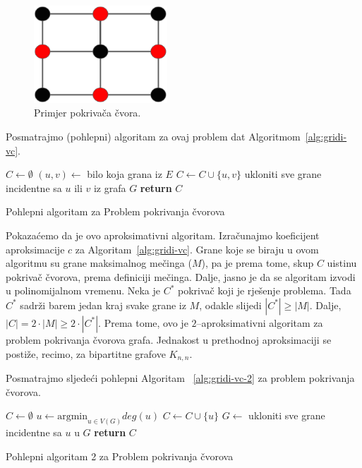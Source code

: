 \documentclass[a4paper, utf8, 11pt, colorlinks]{book}
\begin{document}
  \begin{figure}
  	\centering
  	\includegraphics[width=50mm]{vertex-cover.eps}
  	\caption{Primjer pokrivača čvora.} 
  	\label{vertex-cover}
  \end{figure}
  
  Posmatrajmo (pohlepni) algoritam za ovaj problem dat Algoritmom~\ref{alg:gridi-vc}. 
  
  \begin{algorithm}[H] 
  	\begin{algorithmic}[1]
  		\STATE $C \gets \emptyset$
  		\STATE $(u,v) \gets$ bilo koja grana iz $E$
  		\STATE $C \gets C \cup \{u,v\}$
  		\STATE ukloniti sve grane incidentne sa  $u$ ili $v$ iz grafa $G$
  		\ENDWHILE
  		\STATE \textbf{return} $C$
  	\end{algorithmic}   
   
     \caption{Pohlepni algoritam za Problem pokrivanja čvorova}
 \label{alg:gridi-vc}
  \end{algorithm}
  
  \noindent Pokazaćemo da je ovo aproksimativni algoritam. Izračunajmo koeficijent aproksimacije $c$ za Algoritam~\ref{alg:gridi-vc}.
  Grane koje se biraju u ovom algoritmu su grane maksimalnog mečinga ($M$), pa je prema tome, skup $C$ uistinu pokrivač čvorova, prema definiciji mečinga. Dalje, jasno je da se algoritam izvodi u polinomijalnom vremenu. Neka je $C^*$ pokrivač koji je rješenje problema. Tada $C^*$ sadrži barem jedan kraj svake grane iz $M$, odakle slijedi $|C^*|\geq |M|$. Dalje, $|C|= 2 \cdot |M| \geq 2 \cdot |C^*|$. Prema tome, ovo je $2$--aproksimativni algoritam za problem pokrivanja čvorova grafa. Jednakost u prethodnoj aproksimaciji se postiže, recimo, za bipartitne grafove $K_{n,n}$. 
  
  Posmatrajmo sljedeći pohlepni Algoritam ~\ref{alg:gridi-vc-2} za problem pokrivanja čvorova.  
  
  \begin{algorithm}[H] 
  	\begin{algorithmic}[1]
  		\STATE $C \gets \emptyset$
  		\STATE  $u \gets \textrm{argmin}_{u \in V(G)} deg(u)$
  		\STATE  $C \gets C \cup \{u\}$
  		\STATE $G \gets$ ukloniti sve grane incidentne sa $u$ u $G$  
  		\ENDWHILE
  		\STATE \textbf{return} $C$
  	\end{algorithmic}
     	\caption{Pohlepni algoritam 2 za Problem pokrivanja čvorova}
        \label{alg:gridi-vc-2}
  \end{algorithm}
  
\end{document}
